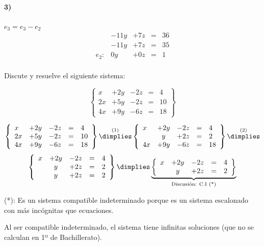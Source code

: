 \documentclass[palatino,nosec,nochap]{Docencia}
\begin{document}
\begin{problem}
\paragraph{3)} $e_3=e_3-e_2$
\[
\begin{array}{lcccl}
&-11y&+7z&=&36\\
&-11y&+7z&=&35\\
\hline
e_2:   & 0y&+0z&=&1\\
\end{array}
\]	

\end{problem}


\newpage
\begin{problem}

Discute y resuelve el siguiente sistema:

\[
\left\{\begin{array}{lcccl}
x&+2y&-2z&=&4\\
2x&+5y&-2z&=&10\\
4x&+9y&-6z&=&18
\end{array}\right\}
\]

\solution

\[
\left\{\begin{array}{lcccl}
x&+2y&-2z&=&4\\
2x&+5y&-2z&=&10\\
4x&+9y&-6z&=&18
\end{array}\right\}
\overset{(1)}{\dimplies}
\left\{\begin{array}{lcccl}
x&+2y&-2z&=&4\\
 &y&+2z&=&2 \\
4x&+9y&-6z&=&18
\end{array}\right\}
\overset{(2)}{\dimplies}\]
\[
\left\{\begin{array}{lcccl}
x&+2y&-2z&=&4\\
 &y&+2z&=&2 \\
 &y&+2z&=&2 \\
\end{array}\right\}
\dimplies
\underbrace{\left\{\begin{array}{lcccl}
x&+2y&-2z&=&4\\
 &y&+2z&=&2 
\end{array}\right\}}_{\text{Discusión: C.I (*)}}
\]

(*): Es un sistema compatible indeterminado porque es un sistema escalonado con más incógnitas que ecuaciones.

Al ser compatible indeterminado, el sistema tiene infinitas soluciones (que no se calculan en 1º de Bachillerato).



\end{problem}
\end{document}
